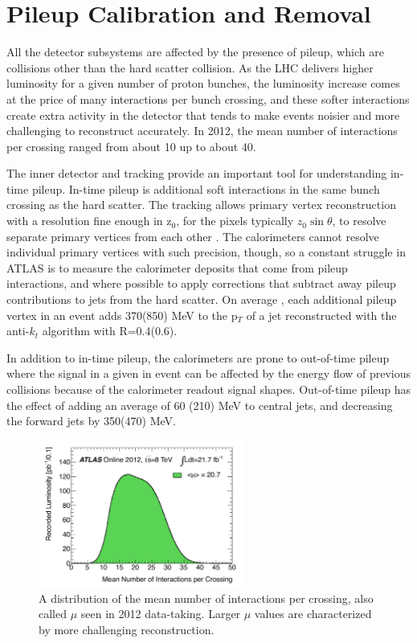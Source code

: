\section{Pileup Calibration and Removal}
\label{sec:pileup}
All the detector subsystems are affected by the presence of pileup, which are collisions other than the hard scatter 
collision.  As the LHC delivers higher luminosity for a given number of proton bunches, the luminosity increase comes 
at the price of many interactions per bunch crossing, and these softer interactions create extra activity in the detector 
that tends to make events noisier and more challenging to reconstruct accurately.  In 2012, the mean number of 
interactions per crossing ranged from about 10 up to about 40.  

The inner detector and tracking provide an important tool for understanding in-time pileup.  In-time pileup 
is additional soft interactions in the same bunch crossing as the hard scatter.  The tracking allows primary vertex reconstruction 
with a resolution fine enough in z$_0$, for the pixels typically $z_0\sin\theta$, 
to resolve separate primary vertices from each other \cite{pileup_tracks}.   The calorimeters cannot resolve individual primary vertices with such precision, 
though, so a constant struggle in ATLAS is to measure the calorimeter deposits that come from pileup interactions, 
and where possible to apply corrections that subtract away pileup contributions to jets from the hard scatter.  On average
, each additional pileup vertex in an event adds 370(850) \cite{pileup} MeV to the p$_T$ of a jet reconstructed with the anti-$k_t$ algorithm with R=0.4(0.6).

In addition to in-time pileup, the calorimeters are prone to out-of-time pileup where 
the signal in a given in event can be affected by the energy flow of previous collisions because of the 
calorimeter readout signal shapes.  Out-of-time pileup has the effect of adding an average of 60
(210) MeV to central jets, and decreasing the forward jets by 350(470) MeV.  


\begin{figure}
    \center
	\includegraphics[width=0.6\textwidth]{ReconstructionPerformance/images/mu_2012-dec.pdf}
	\caption{A distribution of the mean number of interactions per crossing, also called $\mu$ seen in 2012 data-taking.  Larger $\mu$ values are characterized by more challenging reconstruction. 	\label{fig:mu_2012}  }
\end{figure}

